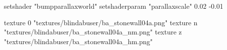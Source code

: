 	setshader "bumpparallaxworld"
	setshaderparam "parallaxscale" 0.02 -0.01

		texture 0 "textures/blindabuser/ba_stonewall04a.png"
		texture n "textures/blindabuser/ba_stonewall04a_nm.png"
		texture z "textures/blindabuser/ba_stonewall04a_hm.png"
